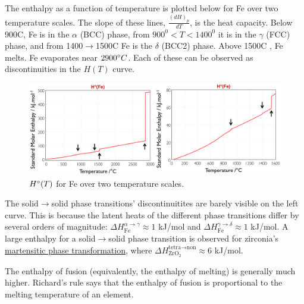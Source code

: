 \documentclass[12pt]{article}
\begin{document}
The enthalpy as a function of temperature is plotted below for Fe over two temperature scales. The slope of these lines, $\frac{(dH)_p}{dT}$, is the heat capacity.  Below 900\degree C, Fe is in the $\alpha$ (BCC) phase, from $900^0 < T < 1400^0$ it is in the $\gamma$ (FCC) phase, and from 1400$\to$1500\degree C Fe is the $\delta$ (BCC2) phase. Above 1500\degree C , Fe melts. Fe evaporates near $2900 \degree C$. Each of these can be observed as discontinuities in the $H(T)$ curve. \\
\begin{figure}[h]
\label{enthalpy_vs_T}
\centering
\includegraphics[width = \textwidth]{H_of_T_labeled.png}
\caption{$H\degree (T)$ for Fe over two temperature scales.}
\end{figure}
The solid$\to$solid phase transitions' discontinuitites are barely visible on the left curve. This is because the latent heats of the different phase transitions differ by several orders of magnitude: $\Delta H_\text{Fe}^{\alpha \rightarrow \gamma} \approx 1$ kJ/mol and $\Delta H_\text{Fe}^{\gamma \rightarrow \delta} \approx 1$ kJ/mol. A large enthalpy for a solid$\to$solid phase transition is observed for zirconia's \href{http://en.wikipedia.org/wiki/Diffusionless_transformation#Martensitic_transformation}{martensitic phase transformation}, where $\Delta H_{\text{ZrO}_2}^{\text{tetra}\rightarrow \text{non}} \approx 6$ kJ/mol.  

The enthalpy of fusion (equivalently, the enthalpy of melting) is generally much higher. Richard's rule says that the enthalpy of fusion is proportional to the melting temperature of an element. 

\end{document}
